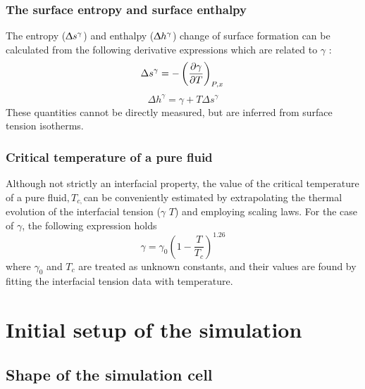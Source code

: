 \documentclass[9pt,tutorial]{livecoms}
\begin{document}
\subsubsection{The surface entropy and surface enthalpy}

The entropy (${\Updelta}s^{{\gamma}}$) and enthalpy
(${\Updelta}h^{{\gamma}}$) change of surface formation can be
calculated from the following derivative expressions which are related to
{${\gamma}$} \citep{rowlinson1982}: 
\begin{equation}
  \Delta s^{\gamma} =-\left(\frac{\partial\gamma}{\partial T}\right)_{P,x} \\
  \label{eq:6}
\end{equation}
\begin{equation}
  \Delta h^{\gamma} =\gamma+T\Delta s^{\gamma}
  \label{eq:7}
\end{equation}
These quantities cannot be directly measured, but are inferred from surface tension isotherms.

\subsubsection{Critical temperature of a pure fluid}

Although not strictly an interfacial property, the value of the critical
temperature of a pure fluid$, T_{c, }$can be conveniently estimated by
extrapolating the thermal evolution of the interfacial tension (${\gamma}$
\textendash{} $T$) and employing scaling laws. For the
case of ${\gamma}$, the following expression holds \citep{rowlinson1982}
\begin{equation}
\gamma=\gamma_{0}\left(1-\frac{T}{T_{c}}\right)^{1.26}
\label{eq:8}
\end{equation}
where ${\gamma}_{0}$ and $T_{c}$ are treated as unknown constants,
and their values are found by fitting the interfacial tension data with
temperature.

\section{Initial setup of the simulation}
\label{sec:setup}
\subsection{Shape of the simulation cell}
\end{document}
